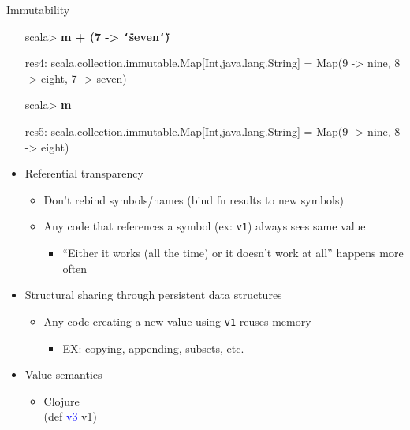 \documentclass{beamer}
\renewcommand{\textquotedbl}{\texttt{\char`\"}}
\begin{document}
\begin{frame}[allowframebreaks]{Immutability}
\begin{itemize}
\begin{small}
\bigskip

{\ttfamily\color{black}
\textcolor[rgb]{0.0,0.0,0.8039216}{scala{\textgreater} }\textbf{m + (7
-{\textgreater} {\textquotedbl}seven{\textquotedbl})}}

{\ttfamily\color{black}
res4: scala.collection.immutable.Map[Int,java.lang.String] = Map(9
\textcolor[rgb]{0.69803923,0.13333334,0.13333334}{{}-{\textgreater}}
nine, 8
\textcolor[rgb]{0.69803923,0.13333334,0.13333334}{{}-{\textgreater}}
eight, 7
\textcolor[rgb]{0.69803923,0.13333334,0.13333334}{{}-{\textgreater}}
seven)}


\bigskip

{\ttfamily\color{black}
\textcolor[rgb]{0.0,0.0,0.8039216}{scala{\textgreater} }\textbf{m}}

{\ttfamily\color{black}
res5: scala.collection.immutable.Map[Int,java.lang.String] = Map(9
\textcolor[rgb]{0.69803923,0.13333334,0.13333334}{{}-{\textgreater}}
nine, 8
\textcolor[rgb]{0.69803923,0.13333334,0.13333334}{{}-{\textgreater}}
eight)}
\end{small}


    \framebreak
  \item Referential transparency
    \begin{itemize}
    \item Don't rebind symbols/names (bind fn results to new symbols)
    \item Any code that references a symbol (ex: \texttt{v1}) always
      sees same value
      \begin{itemize}
      \item ``Either it works (all the time) or it doesn't work at
        all'' happens more often
      \end{itemize}
    \end{itemize}
  \item Structural sharing through persistent data structures
    \begin{itemize}
    \item Any code creating a new value using \texttt{v1} reuses
      memory
      \begin{itemize}
      \item EX: copying, appending, subsets, etc.
      \end{itemize}
    \end{itemize} 

    \framebreak
  \item Value semantics
    \begin{itemize}
    \item Clojure\\
{\ttfamily\color{black}
%
\textcolor[rgb]{0.54901963,0.54901963,0.54901963}{(}\textcolor[rgb]{0.49803922,0.0,0.49803922}{def}
\textcolor{blue}{v3}
v1\textcolor[rgb]{0.54901963,0.54901963,0.54901963}{)}}


\end{itemize}
\end{itemize}
\end{frame}
\end{document}
